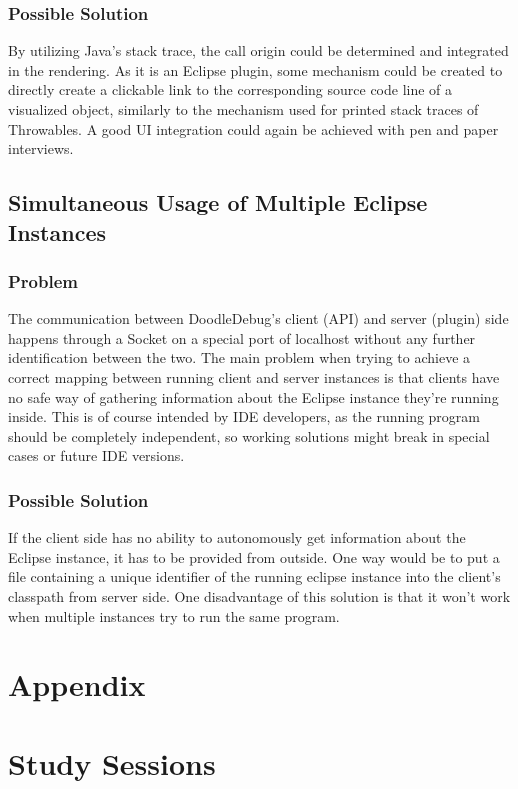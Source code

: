 \documentclass{acm_proc_article-sp}
\begin{document}
\subsubsection{Possible Solution}
By utilizing Java's stack trace, the call origin could be determined and integrated in the rendering. As it is an Eclipse plugin, some mechanism could be created to directly create a clickable link to the corresponding source code line of a visualized object, similarly to the mechanism used for printed stack traces of Throwables. A good UI integration could again be achieved with pen and paper interviews.

\subsection{Simultaneous Usage of Multiple Eclipse Instances}
\subsubsection{Problem}
The communication between DoodleDebug's client (API) and server (plugin) side happens through a Socket on a special port of localhost without any further identification between the two. The main problem when trying to achieve a correct mapping between running client and server instances is that clients have no safe way of gathering information about the Eclipse instance they're running inside. This is of course intended by IDE developers, as the running program should be completely independent, so working solutions might break in special cases or future IDE versions.
\subsubsection{Possible Solution}
If the client side has no ability to autonomously get information about the Eclipse instance, it has to be provided from outside. One way would be to put a file containing a unique identifier of the running eclipse instance into the client's classpath from server side. One disadvantage of this solution is that it won't work when multiple instances try to run the same program.


\section{Appendix}

\section{Study Sessions}
\end{document}
